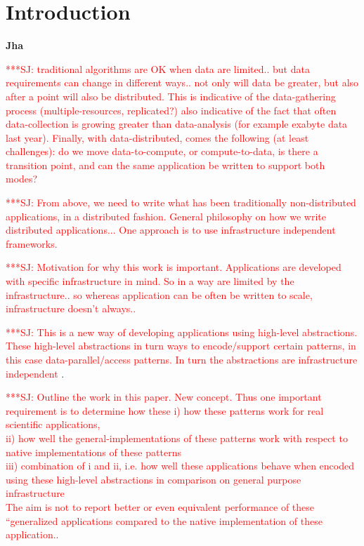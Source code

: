 \documentclass[conference,final]{IEEEtran}
\newcommand{\jhanote}[1]{ {\textcolor{red} { ***SJ: #1 }}}
\newcommand{\jhanote}[1]{}
\begin{document}
\section{Introduction} {\bf Jha} 

\jhanote{traditional algorithms are OK when data are limited.. but data
  requirements can change in different ways.. not only will data be
  greater, but also after a point will also be distributed. This is
  indicative of the data-gathering process (multiple-resources,
  replicated?) also indicative of the fact that often data-collection
  is growing greater than data-analysis (for example exabyte data last
  year).  Finally, with data-distributed, comes the following (at
  least challenges): do we move data-to-compute, or compute-to-data,
  is there a transition point, and can the same application be written
  to support both modes?}

\jhanote{From above, we need to write what has been traditionally
  non-distributed applications, in a distributed fashion. General
  philosophy on how we write distributed applications... One approach
  is to use infrastructure independent frameworks.}

\jhanote{Motivation for why this work is important. Applications
  are developed with specific infrastructure in mind. So in a
  way are limited by the infrastructure.. so whereas application
  can be often be written to scale, infrastructure doesn't
  always..}

\jhanote{This is a new way of developing applications using high-level
  abstractions. These high-level abstractions in turn ways to
  encode/support certain patterns, in this case data-parallel/access
  patterns. In turn the abstractions are infrastructure independent}.


\jhanote{Outline the work in this paper. New concept. Thus one
  important requirement is to determine how these
  i) how these patterns work for real scientific applications, \\
  ii) how well the general-implementations of these patterns work with
  respect to native implementations of these patterns \\
  iii) combination of i and ii, i.e. how well these applications
  behave when encoded using these high-level abstractions
  in comparison on general purpose infrastructure\\
  The aim is not to report better or even equivalent performance of
  these ``generalized applications compared to the native
  implementation of these application..}
\end{document}
